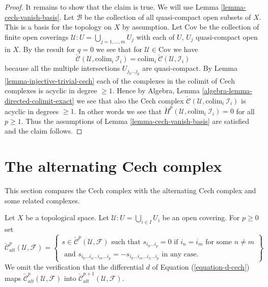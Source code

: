 \begin{proof}
\medskip\noindent
It remains to show that the claim is true. We will use
Lemma \ref{lemma-cech-vanish-basis}.
Let $\mathcal{B}$ be the collection of all quasi-compact open
subsets of $X$. This is a basis for the topology on $X$ by assumption.
Let $\text{Cov}$ be the collection of finite open coverings
$\mathcal{U} : U = \bigcup_{j = 1, \ldots, m} U_j$ with each
of $U$, $U_j$ quasi-compact open in $X$. By the result for $q = 0$
we see that for $\mathcal{U} \in \text{Cov}$ we have
$$
\check{\mathcal{C}}(\mathcal{U}, \text{colim}_i\ \mathcal{I}_i)
=
\text{colim}_i\ \check{\mathcal{C}}(\mathcal{U}, \mathcal{I}_i)
$$
because all the multiple intersections $U_{j_0 \ldots j_p}$
are quasi-compact. By Lemma \ref{lemma-injective-trivial-cech}
each of the complexes in the colimit of Cech complexes is
acyclic in degree $\geq 1$. Hence by
Algebra, Lemma \ref{algebra-lemma-directed-colimit-exact}
we see that also the Cech complex
$\check{\mathcal{C}}(\mathcal{U}, \text{colim}_i\ \mathcal{I}_i)$
is acyclic in degrees $\geq 1$. In other words we see that
$\check{H}^p(\mathcal{U},  \text{colim}_i\ \mathcal{I}_i) = 0$
for all $p \geq 1$. Thus the assumptions of
Lemma \ref{lemma-cech-vanish-basis} are satisfied and the claim follows.
\end{proof}













\section{The alternating Cech complex}
\label{section-alternating-cech}

\noindent
This section compares the Cech complex with the alternating Cech
complex and some related complexes.

\medskip\noindent
Let $X$ be a topological space. Let $\mathcal{U} : U = \bigcup_{i \in I} U_i$
be an open covering. For $p \geq 0$ set
$$
\check{\mathcal{C}}_{alt}^p(\mathcal{U}, \mathcal{F})
=
\left\{
\begin{matrix}
s \in  \check{\mathcal{C}}^p(\mathcal{U}, \mathcal{F})
\text{ such that }
s_{i_0 \ldots i_p} = 0 \text{ if } i_n = i_m \text{ for some } n \not = m\\
\text{ and }
s_{i_0\ldots i_n \ldots i_m \ldots i_p}
=
-s_{i_0\ldots i_m \ldots i_n \ldots i_p}
\text{ in any case.}
\end{matrix}
\right\}
$$
We omit the verification that the differential $d$ of
Equation (\ref{equation-d-cech}) maps
$\check{\mathcal{C}}^p_{alt}(\mathcal{U}, \mathcal{F})$ into 
$\check{\mathcal{C}}^{p + 1}_{alt}(\mathcal{U}, \mathcal{F})$.


